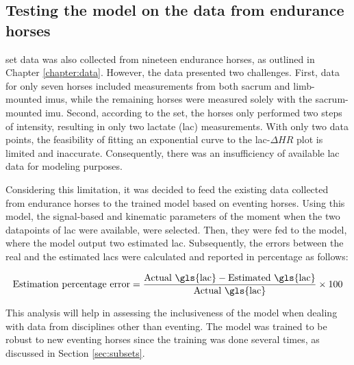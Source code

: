 \subsection{Testing the model on the data from endurance horses}

\gls{set} data was also collected from nineteen endurance horses, as outlined in Chapter \ref{chapter:data}. However, the data presented two challenges. First, data for only seven horses included measurements from both sacrum and limb-mounted \gls{imu}s, while the remaining horses were measured solely with the sacrum-mounted \gls{imu}. Second, according to the \gls{set}, the horses only performed two steps of intensity, resulting in only two lactate (\gls{lac}) measurements. With only two data points, the feasibility of fitting an exponential curve to the \gls{lac}-$\Delta HR$ plot is limited and inaccurate. Consequently, there was an insufficiency of available \gls{lac} data for modeling purposes.

Considering this limitation, it was decided to feed the existing data collected from endurance horses to the trained model based on eventing horses. Using this model, the signal-based and kinematic parameters of the moment when the two datapoints of \gls{lac} were available, were selected. Then, they were fed to the model, where the model output two estimated \gls{lac}. Subsequently, the errors between the real and the estimated \gls{lac}s were calculated and reported in percentage as follows:

\begin{equation}
    \text{Estimation percentage error}=\frac{\text{Actual \gls{lac}}-\text{Estimated \gls{lac}}}{\text{Actual \gls{lac}}}\times100
\end{equation}

This analysis will help in assessing the inclusiveness of the model when dealing with data from disciplines other than eventing. The model was trained to be robust to new eventing horses since the training was done several times, as discussed in Section \ref{sec:subsets}.
